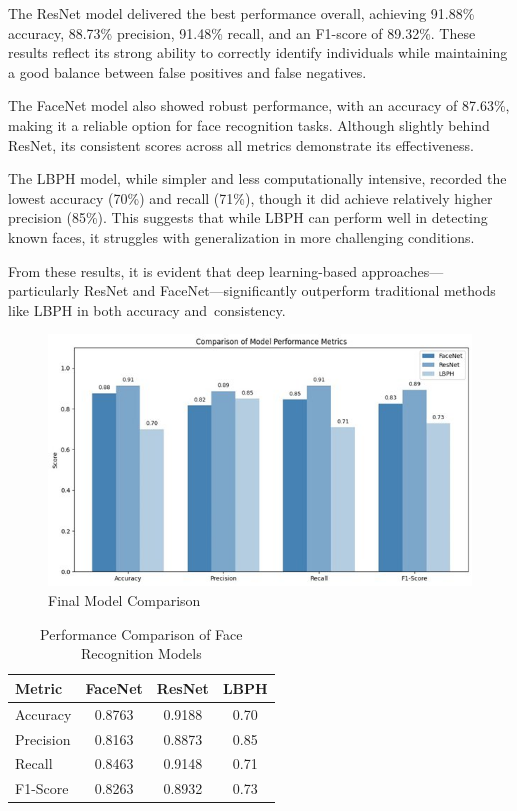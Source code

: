 \documentclass[conference]{IEEEtran}
\begin{document}
The ResNet model delivered the best performance overall, achieving 91.88\% accuracy, 88.73\% precision, 91.48\% recall, and an F1-score of 89.32\%. These results reflect its strong ability to correctly identify individuals while maintaining a good balance between false positives and false negatives.

The FaceNet model also showed robust performance, with an accuracy of 87.63\%, making it a reliable option for face recognition tasks. Although slightly behind ResNet, its consistent scores across all metrics demonstrate its effectiveness.

The LBPH model, while simpler and less computationally intensive, recorded the lowest accuracy (70\%) and recall (71\%), though it did achieve relatively higher precision (85\%). This suggests that while LBPH can perform well in detecting known faces, it struggles with generalization in more challenging conditions.

From these results, it is evident that deep learning-based approaches—particularly ResNet and FaceNet—significantly outperform traditional methods like LBPH in both accuracy and consistency.
\begin{figure}[]
    \centering
    \includegraphics[width=.45\textwidth]{../blackbook/imgs/final_model_comp.jpg}
    \caption{Final Model Comparison}
\end{figure}


\begin{table}[]
    \centering
    \begin{tabular}{|l|c|c|c|}
        \hline
        \textbf{Metric} & \textbf{FaceNet} & \textbf{ResNet} & \textbf{LBPH} \\ \hline
        Accuracy        & 0.8763           & 0.9188          & 0.70          \\ \hline
        Precision       & 0.8163           & 0.8873          & 0.85          \\ \hline
        Recall          & 0.8463           & 0.9148          & 0.71          \\ \hline
        F1-Score        & 0.8263           & 0.8932          & 0.73          \\ \hline
    \end{tabular}
    \caption{Performance Comparison of Face Recognition Models}
    \label{tab:comparison}
\end{table}
\end{document}
